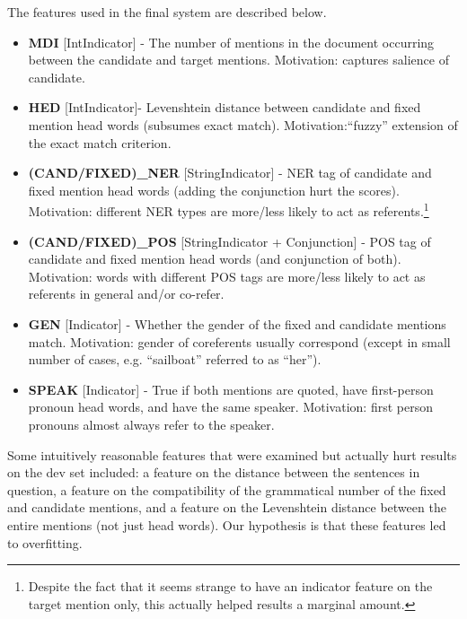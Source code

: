 \documentclass[12pt,a4paper]{article}
\begin{document}
The features used in the final system are described below. 

\begin{itemize}[itemsep=-1pt]
\item
	\textbf{MDI} [IntIndicator] - The number of mentions in the document occurring between the candidate and target mentions. Motivation: captures salience of candidate. 
\item
	\textbf{HED} [IntIndicator]- Levenshtein distance between candidate and fixed mention head words (subsumes exact match).  Motivation:``fuzzy'' extension of the exact match criterion. 
\item
	\textbf{(CAND/FIXED)\_NER} [StringIndicator] - NER tag of candidate and fixed mention head words (adding the conjunction hurt the scores). Motivation: different NER types are more/less likely to act as referents.\footnote{Despite the fact that it seems strange to have an indicator feature on the target mention only, this actually helped results a marginal amount.}
\item
	\textbf{(CAND/FIXED)\_POS} [StringIndicator + Conjunction] - POS tag of candidate and fixed mention head words (and conjunction of both). Motivation: words with different POS tags are more/less likely to act as referents in general and/or co-refer.
\item
	\textbf{GEN} [Indicator] - Whether the gender of the fixed and candidate mentions match. Motivation: gender of coreferents usually correspond (except in small number of cases, e.g. ``sailboat'' referred to as ``her''). 
\item
	\textbf{SPEAK} [Indicator] - True if both mentions are quoted,  have first-person pronoun head words, and have the same speaker. Motivation: first person pronouns almost always refer to the speaker. 
\end{itemize}
	
Some intuitively reasonable features that were examined but actually hurt results on the dev set included: a feature on the distance between the sentences in question, a feature on the compatibility of the grammatical number of the fixed and candidate mentions, and a feature on the Levenshtein distance between the entire mentions (not just head words).
Our hypothesis is that these features led to overfitting. 
\end{document}

